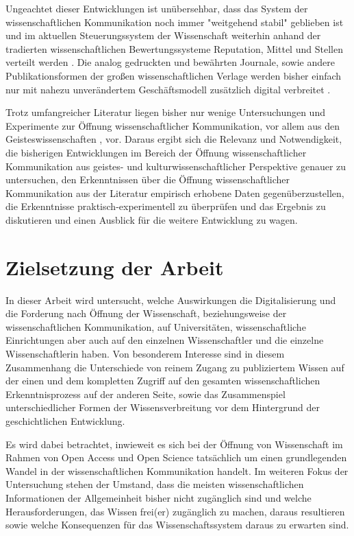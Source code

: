 Ungeachtet dieser Entwicklungen ist unübersehbar, dass das System der wissenschaftlichen Kommunikation noch immer "weitgehend stabil" \cite{Hanekop_2014} geblieben ist und im aktuellen Steuerungssystem der Wissenschaft weiterhin anhand der tradierten wissenschaftlichen Bewertungssysteme Reputation, Mittel und Stellen verteilt werden \cite{hollricher_wandel_2009} \cite{cite:4}. Die analog gedruckten und bewährten Journale, sowie andere Publikationsformen der großen wissenschaftlichen Verlage werden bisher einfach nur mit nahezu unverändertem Geschäftsmodell zusätzlich digital verbreitet \cite{Hanekop_2014} \cite{boai_2012}.

Trotz umfangreicher Literatur liegen bisher nur wenige Untersuchungen und Experimente zur Öffnung wissenschaftlicher Kommunikation, vor allem aus den Geisteswissenschaften \cite{naeder_2010_open}, vor. Daraus ergibt sich die Relevanz und Notwendigkeit, die bisherigen Entwicklungen im Bereich der Öffnung wissenschaftlicher Kommunikation aus geistes- und kulturwissenschaftlicher Perspektive genauer zu untersuchen, den Erkenntnissen über die Öffnung wissenschaftlicher Kommunikation aus der Literatur empirisch erhobene Daten gegenüberzustellen, die Erkenntnisse praktisch-experimentell zu überprüfen und das Ergebnis zu diskutieren und einen Ausblick für die weitere Entwicklung zu wagen.

\section{Zielsetzung der Arbeit}

In dieser Arbeit wird untersucht, welche Auswirkungen die Digitalisierung und die Forderung nach Öffnung der Wissenschaft, beziehungsweise der wissenschaftlichen Kommunikation, auf Universitäten, wissenschaftliche Einrichtungen aber auch auf den einzelnen Wissenschaftler und die einzelne Wissenschaftlerin haben. Von besonderem Interesse sind in diesem Zusammenhang die Unterschiede von reinem Zugang zu publiziertem Wissen auf der einen und dem kompletten Zugriff auf den gesamten wissenschaftlichen Erkenntnisprozess auf der anderen Seite, sowie das Zusammenspiel unterschiedlicher Formen der Wissensverbreitung vor dem Hintergrund der geschichtlichen Entwicklung.

Es wird dabei betrachtet, inwieweit es sich bei der Öffnung von Wissenschaft im Rahmen von Open Access und Open Science tatsächlich um einen grundlegenden Wandel in der wissenschaftlichen Kommunikation handelt. Im weiteren Fokus der Untersuchung stehen der Umstand, dass die meisten wissenschaftlichen Informationen der Allgemeinheit bisher nicht zugänglich sind und welche Herausforderungen, das Wissen frei(er) zugänglich zu machen, daraus resultieren sowie welche Konsequenzen für das Wissenschaftssystem daraus zu erwarten sind.

